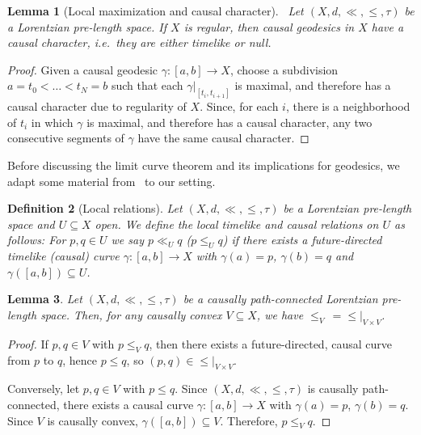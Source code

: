 \documentclass[a4paper,11pt]{article}
\numberwithin{equation}{section}
\theoremstyle{plain}
\newtheorem{Definition}{Definition}[section]
\newtheorem{Lemma}[Definition]{Lemma}
\theoremstyle{definition}
\newcommand{\LpLSn}{Lorentzian pre-length space}
\newcommand\LpLSmaths{\ensuremath{(X, d, \ll, \leq, \tau)}}
\begin{document}
\begin{Lemma}[Local maximization and causal character] \ 
\label{Lemma: Geodesicshavecausalcharacter}
Let $(X,d,\ll,\leq,\tau)$ be a Lorentzian pre-length space. If $X$ is regular, then causal geodesics in $X$ have a causal character, i.e.\ they are either timelike or null.
\end{Lemma}
\begin{proof} 
Given a causal geodesic $\gamma \colon [a, b] \to X$, choose a subdivision $a=t_0<\dots<t_N=b$ such that each $\gamma|_{[t_i,t_{i+1}]}$ is maximal,
and therefore has a causal character due to regularity of $X$. Since, for each $i$, there is a neighborhood of $t_i$ in which $\gamma$ is maximal,
and therefore has a causal character, any two consecutive segments of $\gamma$ have the same causal character.
\end{proof}


Before discussing the limit curve theorem and its implications for geodesics, we adapt some material from~\cite{hau2020causal} to our setting.

\begin{Definition}[Local relations]
Let $(X,d,\ll,\leq,\tau)$ be a Lorentzian pre-length space and $U \subseteq X$ open. We define the local timelike and causal relations on $U$ as follows: For $p,q \in U$ we say $p \ll_U q$ ($p \leq_U q$) if there exists a future-directed timelike (causal) curve $\gamma \colon [a, b] \to X$ with $\gamma(a) = p$, $\gamma(b) = q$ and $\gamma \left( [a, b] \right) \subseteq U$.
\end{Definition}

\begin{Lemma}
Let {\LpLSmaths} be a causally path-connected {\LpLSn}. Then, for any causally convex $V \subseteq X$, we have $\le_V \, = \left. \le \right|_{V \times V}$.
\end{Lemma}

\begin{proof}
If $p, q \in V$ with $p \le_V q$, then there exists a future-directed, causal curve from $p$ to $q$, hence $p \le q$, so $(p, q) \in \left. \le \right|_{V \times V}$.

Conversely, let $p, q \in V$ with $p \le q$. Since {\LpLSmaths} is causally path-connected, there exists a causal curve $\gamma \colon [a, b] \to X$ with $\gamma(a) = p$, $\gamma(b) = q$. Since $V$ is causally convex, $\gamma \left( [a, b] \right) \subseteq V$. Therefore, $p \le_V q$.
\end{proof}
\end{document}
